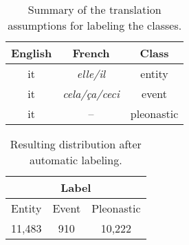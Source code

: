 \documentclass[10pt, a4paper]{article} \usepackage{lrec} \usepackage{multibib}
\begin{document}
\begin{table}\centering \begin{tabular}{ccc} \toprule \textbf{English} &
\textbf{French} &  \textbf{Class} \\ \midrule it &  \textit{elle/il}  & entity\\
it & \textit{cela/ça/ceci} & event  \\ it  &  -- &pleonastic \\
\bottomrule
\end{tabular} 
\caption{Summary of the translation assumptions for labeling the
classes. }\label{tab:classrules} 
\end{table}



\begin{table}[h!]\centering \begin{tabular}{ccc}
\multicolumn{3}{c}{\textbf{Label}}\\ 
\toprule 
Entity & Event & Pleonastic \\
\midrule 
11,483 & 910 &10,222\\ 
\bottomrule 
\end{tabular} 
\caption{Resulting distribution after automatic labeling. }
\label{tab:resultinglabels} 
\end{table}
\end{document}
